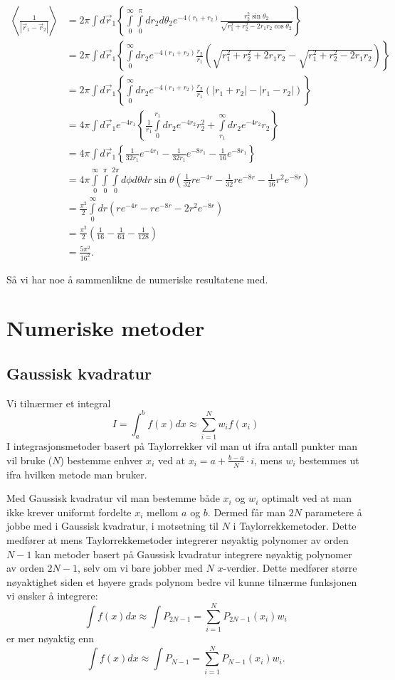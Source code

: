 \documentclass[norsk, 12pt]{article}
\newcommand{\f}{\frac}
\newcommand{\vr}{\vec{r}}
\begin{document}
\begin{align*}
 \left\langle\f{1}{|\vr_1-\vr_2|}\right\rangle&=2\pi\int d\vr_1\left\{\int\limits_0^\infty\int\limits_0^\pi dr_2d\theta_2e^{-4(r_1+r_2)}\f{r_2^2\sin\theta_2}{\sqrt{r_1^2+r_2^2-2r_1r_2\cos\theta_2}} \right\} \\
 &= 2\pi\int d\vr_1\left\{\int\limits_0^\infty dr_2e^{-4(r_1+r_2)}\f{r_2}{r_1}\left(\sqrt{r_1^2+r_2^2+2r_1r_2}-\sqrt{r_1^2+r_2^2-2r_1r_2}\right)\right\}\\
 &= 2\pi\int d\vr_1\left\{\int\limits_0^\infty dr_2e^{-4(r_1+r_2)}\f{r_2}{r_1}\left(|r_1+r_2|-|r_1-r_2|\right)\right\}\\
 &= 4\pi\int d\vr_1e^{-4r_1}\left\{\f{1}{r_1}\int\limits_0^{r_1}dr_2e^{-4r_2}r_2^2 + \int\limits_{r_1}^\infty dr_2e^{-4r_2}r_2\right\}\\
 &= 4\pi\int d\vr_1\left\{\f{1}{32r_1}e^{-4r_1}-\f{1}{32r_1}e^{-8r_1}-\f{1}{16}e^{-8r_1}\right\}\\
 &= 4\pi\int\limits_0^\infty\int\limits_0^\pi\int\limits_0^{2\pi}d\phi d\theta dr\sin\theta\left(\f{1}{32}re^{-4r}-\f{1}{32}re^{-8r}-\f{1}{16}r^2e^{-8r}\right)\\
 &= \f{\pi^2}{2}\int\limits_0^\infty dr\left(re^{-4r}-re^{-8r}-2r^2e^{-8r}\right)\\
 &= \f{\pi^2}{2}\left(\f{1}{16}-\f{1}{64}-\f{1}{128}\right)\\
 &= \f{5\pi^2}{16^2}.
\end{align*}

Så vi har noe å sammenlikne de numeriske resultatene med.

\section{Numeriske metoder}
\subsection{Gaussisk kvadratur}
Vi tilnærmer et integral
$$ I = \int_a^bf(x)dx \approx \sum\limits_{i=1}^Nw_if(x_i)$$
I integrasjonsmetoder basert på Taylorrekker vil man ut ifra antall punkter man vil bruke ($N$) bestemme enhver $x_i$
ved at $x_i = a + \f{b-a}{N}\cdot i$, mens $w_i$ bestemmes ut ifra hvilken metode man bruker.

Med Gaussisk kvadratur vil man bestemme både $x_i$ og $w_i$ optimalt ved at man ikke krever uniformt fordelte $x_i$
mellom $a$ og $b$. Dermed får man $2N$ parametere å jobbe med i  Gaussisk kvadratur, i motsetning til $N$ i Taylorrekkemetoder.
Dette medfører at mens Taylorrekkemetoder integrerer nøyaktig polynomer av orden $N-1$ kan metoder basert på
Gaussisk kvadratur integrere nøyaktig polynomer av orden $2N-1$, selv om vi bare jobber med $N$ $x$-verdier. Dette
medfører større nøyaktighet siden et høyere grads polynom bedre vil kunne tilnærme funksjonen vi ønsker å integrere:
$$\int f(x)dx\approx \int P_{2N-1} = \sum\limits_{i=1}^{N} P_{2N-1}(x_i)w_i$$
er mer nøyaktig enn
$$\int f(x)dx\approx \int P_{N-1} = \sum\limits_{i=1}^{N} P_{N-1}(x_i)w_i.$$
\end{document}
